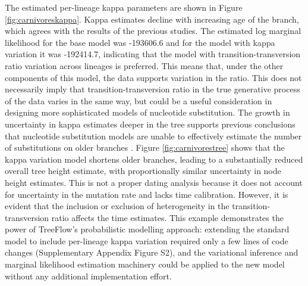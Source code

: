 \documentclass{article}
\begin{document}
The estimated per-lineage kappa parameters are shown in Figure \ref{fig:carnivoreskappa}. Kappa estimates decline with increasing age of the branch, which agrees with the results of the previous studies. The estimated log marginal likelihood for the base model was -193606.6 and for the model with kappa variation it was -192414.7, indicating that the model with transition-transversion ratio variation across lineages is preferred. This means that, under the other components of this model, the data supports variation in the ratio. This does not necessarily imply that transition-transversion ratio in the true generative process of the data varies in the same way, but could be a useful consideration in designing more sophisticated models of nucleotide substitution. The growth in uncertainty in kappa estimates deeper in the tree supports previous conclusions that nucleotide substitution models are unable to effectively estimate the number of substitutions on older branches \cite{duchene2015declining}. Figure \ref{fig:carnivorestree} shows that the kappa variation model shortens older branches, leading to a substantially reduced overall tree height estimate, with proportionally similar uncertainty in node height estimates. This is not a proper dating analysis because it does not account for uncertainty in the mutation rate and lacks time calibration. However, it is evident that the inclusion or exclusion of heterogeneity in the transition-transversion ratio affects the time estimates. This example demonstrates the power of TreeFlow's probabilistic modelling approach: extending the standard model to include per-lineage kappa variation required only a few lines of code changes (Supplementary Appendix Figure S2), and the variational inference and marginal likelihood estimation machinery could be applied to the new model without any additional implementation effort.
\end{document}
